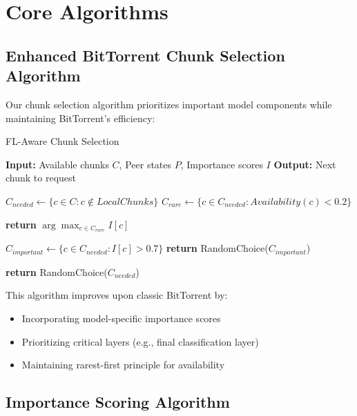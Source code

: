 \documentclass[11pt,conference]{article}
\begin{document}
\section{Core Algorithms}

\subsection{Enhanced BitTorrent Chunk Selection Algorithm}

Our chunk selection algorithm prioritizes important model components while maintaining BitTorrent's efficiency:

\begin{algorithm}
\caption{FL-Aware Chunk Selection}
\label{alg:chunk-selection}
\begin{algorithmic}[1]
\STATE \textbf{Input:} Available chunks $C$, Peer states $P$, Importance scores $I$
\STATE \textbf{Output:} Next chunk to request

    \STATE $C_{needed} \gets \{c \in C : c \notin LocalChunks\}$
    \STATE $C_{rare} \gets \{c \in C_{needed} : Availability(c) < 0.2\}$
    
        \STATE \textbf{return} $\arg\max_{c \in C_{rare}} I[c]$ 
    \ENDIF
    
    \STATE $C_{important} \gets \{c \in C_{needed} : I[c] > 0.7\}$
        \STATE \textbf{return} RandomChoice($C_{important}$) 
    \ENDIF
    
    \STATE \textbf{return} RandomChoice($C_{needed}$) 
\ENDPROCEDURE
\end{algorithmic}
\end{algorithm}

This algorithm improves upon classic BitTorrent by:
\begin{itemize}
    \item Incorporating model-specific importance scores
    \item Prioritizing critical layers (e.g., final classification layer)
    \item Maintaining rarest-first principle for availability
\end{itemize}

\subsection{Importance Scoring Algorithm}
\end{document}
